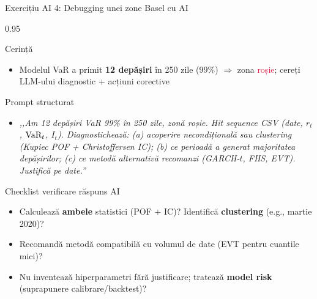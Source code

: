 \documentclass[9pt, aspectratio=169, t]{beamer}
\begin{document}
\begin{frame}[shrink=10]{Exercițiu AI 4: Debugging unei zone Basel cu AI}
    \begin{cminipage}{0.95\textwidth}
    \begin{block}{Cerință}
    \begin{itemize}\setlength{\itemsep}{0pt}
        \item Modelul VaR a primit \textbf{12 depășiri} în 250 zile (99\%) $\Rightarrow$ zona \textcolor{Crimson}{roșie}; cereți LLM-ului diagnostic + acțiuni corective
    \end{itemize}
    \end{block}
    \begin{exampleblock}{Prompt structurat}
    \begin{itemize}\setlength{\itemsep}{0pt}
        \item \textit{,,Am 12 depășiri VaR 99\% în 250 zile, zonă roșie. Hit sequence CSV (date, $r_t$, $\text{VaR}_t$, $I_t$). Diagnostichează: (a) acoperire necondițională sau clustering (Kupiec POF + Christoffersen IC); (b) ce perioadă a generat majoritatea depășirilor; (c) ce metodă alternativă recomanzi (GARCH-$t$, FHS, EVT). Justifică pe date.''}
    \end{itemize}
    \end{exampleblock}
    \begin{alertblock}{Checklist verificare răspuns AI}
    \begin{itemize}\setlength{\itemsep}{0pt}
        \item Calculează \textbf{ambele} statistici (POF + IC)? Identifică \textbf{clustering} (e.g., martie 2020)?
        \item Recomandă metodă compatibilă cu volumul de date (EVT pentru cuantile mici)?
        \item Nu inventează hiperparametri fără justificare; tratează \textbf{model risk} (suprapunere calibrare/backtest)?
    \end{itemize}
    \end{alertblock}
    \end{cminipage}
\end{frame}
\end{document}
